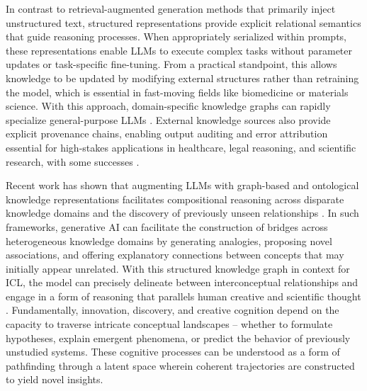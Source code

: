\documentclass{article}
\begin{document}
In contrast to retrieval-augmented generation methods that primarily inject unstructured text, structured representations provide explicit relational semantics that guide reasoning processes. When appropriately serialized within prompts, these representations enable LLMs to execute complex tasks without parameter updates or task-specific fine-tuning. From a practical standpoint, this allows knowledge to be updated by modifying external structures rather than retraining the model, which is essential in fast-moving fields like biomedicine or materials science. With this approach, domain-specific knowledge graphs can rapidly specialize general-purpose LLMs \cite{li_are_2025, hu_lets_2024, wang_enhancing_2025}. External knowledge sources also provide explicit provenance chains, enabling output auditing and error attribution essential for high-stakes applications in healthcare, legal reasoning, and scientific research, with some successes \cite{matsumoto_kragen_2024, almuntashiri_using_2025}. 

Recent work has shown that augmenting LLMs with graph-based and ontological knowledge representations facilitates compositional reasoning across disparate knowledge domains and the discovery of previously unseen relationships \cite{Buehler2024, Ghafarollahi2024, pan_unifying_2023, sharma_og-rag_2024}. In such frameworks, generative AI can facilitate the construction of bridges across heterogeneous knowledge domains by generating analogies, proposing novel associations, and offering explanatory connections between concepts that may initially appear unrelated. With this structured knowledge graph in context for ICL, the model can precisely delineate between interconceptual relationships and engage in a form of reasoning that parallels human creative and scientific thought \cite{sharma_og-rag_2024}. Fundamentally, innovation, discovery, and creative cognition depend on the capacity to traverse intricate conceptual landscapes -- whether to formulate hypotheses, explain emergent phenomena, or predict the behavior of previously unstudied systems. These cognitive processes can be understood as a form of pathfinding through a latent space wherein coherent trajectories are constructed to yield novel insights.
\end{document}
